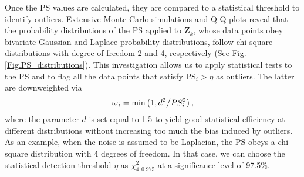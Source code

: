 \documentclass[10pt]{IEEEtran}
\begin{document}
Once the PS values are calculated, they are compared to a statistical threshold to identify outliers. Extensive Monte Carlo simulations and Q-Q plots reveal that the probability distributions of the PS applied to $\bm{Z}_k$, whose data points obey bivariate Gaussian and Laplace probability distributions, follow chi-square distributions with degree of freedom 2 and 4, respectively (See Fig. \ref{Fig.PS_distributions}). This investigation allows us to apply statistical tests to the PS and to flag all the data points that satisfy $\text{PS}_i>\eta$ as outliers. The latter are downweighted via
\begin{equation}
{\varpi _i} = \min \left( {1,{\rm{ }}{{{d^2}} \mathord{\left/
 {\vphantom {{{d^2}} {PS_i^2}}} \right.
 \kern-\nulldelimiterspace} {PS_i^2}}} \right),
\label{Eq:PSdownweightfunction}
\end{equation}
where the parameter $d$ is set equal to 1.5 to yield good statistical efficiency at different distributions without increasing too much the bias induced by outliers. As an example, when the noise is assumed to be Laplacian, the PS obeys a chi-square distribution with 4 degrees of freedom. In that case, we can choose the statistical detection threshold $\eta$ as $\chi_{4,0.975}^2$ at a significance level of 97.5\%.

\vspace{-0.3cm}
\end{document}
